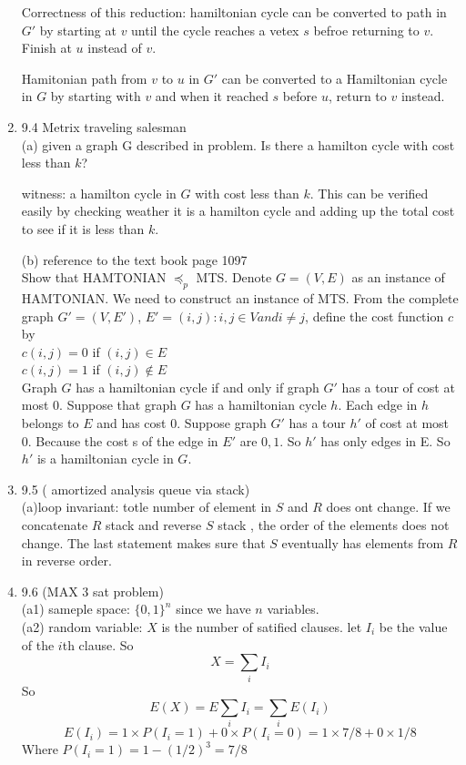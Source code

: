 \documentclass[11pt]{article}
\begin{document}
\begin{enumerate}
\begin{tabbing}
\end{tabbing}

Correctness of this reduction: hamiltonian cycle can be converted to path in $G'$ by starting at $v$ until the cycle reaches a vetex $s$ befroe returning to $v$. Finish at $u$ instead of $v$.

Hamitonian path from $v$ to $u$ in $G'$ can be converted to a Hamiltonian cycle in $G$ by starting with $v$ and when it reached $s$ before $u$, return to $v$ instead.

\item 9.4 Metrix traveling salesman\\
(a) given a graph G described in problem. Is there a hamilton cycle with cost less than $k$?

witness: a hamilton cycle in $G$ with cost less than $k$. This can be verified easily by checking weather it is a hamilton cycle and adding up the total cost to see if it is less than $k$.

(b) reference to the text book page 1097\\
Show that HAMTONIAN $\preccurlyeq_p$ MTS.
Denote $G=(V,E)$ as an instance of HAMTONIAN. We need to construct an instance of MTS.
From the complete graph $G' = (V,E')$, $E'={(i,j):i,j \in V and i \neq j}$, define the cost function $c$ by \\ $c(i,j) = 0$ if $(i,j) \in E$\\  $c(i,j) =1$ if $(i,j) \not\in E$\\

Graph $G$ has a hamiltonian cycle if and only if graph $G'$ has a tour of cost at most $0$. Suppose that graph $G$ has a hamiltonian cycle $h$. Each edge in $h$ belongs to $E$ and has cost $0$. Suppose graph $G'$ has a tour $h'$ of cost at most 0. Because the cost s of the edge in $E'$ are $0,1$. So $h'$ has only edges in E. So $h'$ is a hamiltonian cycle in $G$.

\item 9.5 ( amortized analysis queue via stack)\\
(a)loop invariant: totle number of element in $S$ and $R$ does ont change. If we concatenate $R$ stack and reverse $S$ stack , the order of the elements does not change. The last statement makes sure that $S$ eventually has elements from $R$ in reverse order.


\item 9.6 (MAX 3 sat problem)\\
(a1) sameple space: $\{0,1\}^n$ since we have $n$ variables.\\
(a2) random variable: $X$ is the number of satified clauses. let $I_i$ be the value of the $i$th clause. So 
\[X = \sum_i I_i\]
So \[E(X) = E\sum_i I_i = \sum_i E(I_i)\]
\[ E(I_i) = 1 \times P(I_i =1 ) + 0 \times P(I_i=0) = 1 \times 7/8 + 0 \times 1/8\]
Where $P(I_i=1) = 1-(1/2)^3 = 7/8$\\


\end{enumerate}
\end{document}

